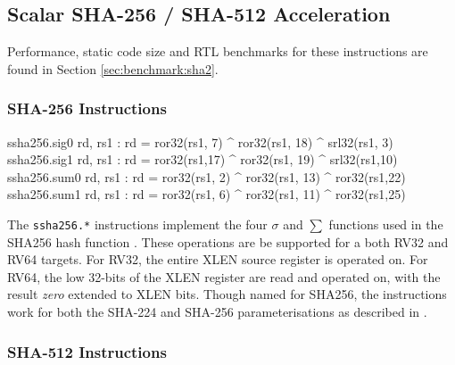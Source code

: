 
\newpage
\subsection{Scalar SHA-256 / SHA-512 Acceleration}
\label{sec:scalar:sha2}

Performance, static code size and RTL benchmarks for these
instructions are found in Section
\ref{sec:benchmark:sha2}.

\subsubsection{SHA-256 Instructions}

\begin{cryptoisa}
ssha256.sig0 rd, rs1 : rd = ror32(rs1, 7) ^ ror32(rs1, 18) ^ srl32(rs1, 3)
ssha256.sig1 rd, rs1 : rd = ror32(rs1,17) ^ ror32(rs1, 19) ^ srl32(rs1,10)
ssha256.sum0 rd, rs1 : rd = ror32(rs1, 2) ^ ror32(rs1, 13) ^ ror32(rs1,22)
ssha256.sum1 rd, rs1 : rd = ror32(rs1, 6) ^ ror32(rs1, 11) ^ ror32(rs1,25)
\end{cryptoisa}

The {\tt ssha256.*}
instructions implement the four $\sigma$ and $\sum$ functions used in
the SHA256 hash function \cite[Section 4.1.2]{nist:fips:180:4}.
These operations are be supported for a both RV32 and RV64 targets.
For RV32, the entire XLEN source register is operated on.
For RV64, the low 32-bits of the XLEN register are read and operated on,
with the result {\em zero} extended to XLEN bits.
Though named for SHA256, the instructions work for both the
SHA-224 and SHA-256 parameterisations as described in
\cite{nist:fips:180:4}.

\subsubsection{SHA-512 Instructions}

